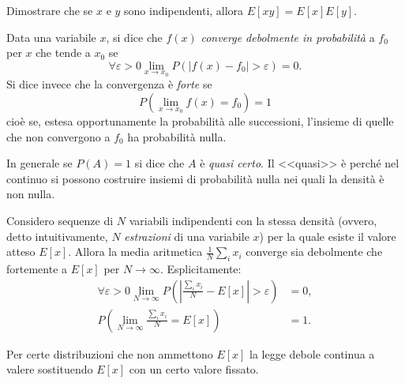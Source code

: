 \begin{exercise}
    Dimostrare che se $x$ e $y$ sono indipendenti, allora $E[xy] = E[x]E[y]$.
\end{exercise}

\begin{definition}
	Data una variabile $x$, si dice che $f(x)$ \emph{converge debolmente in probabilità} a $f_0$ per $x$ che tende a $x_0$ se
	\begin{equation*}
		\forall\varepsilon > 0 \lim_{x\to x_0} P\left( \left| f(x) - f_0 \right| > \varepsilon \right) = 0.
	\end{equation*}
	Si dice invece che la convergenza è \emph{forte} se
	\begin{equation*}
		P\left( \lim_{x\to x_0} f(x) = f_0 \right) = 1
	\end{equation*}
	cioè se, estesa opportunamente la probabilità alle successioni, l'insieme di quelle che non convergono a $f_0$ ha probabilità nulla.
\end{definition}

In generale se $P(A)=1$ si dice che $A$ è \emph{quasi certo}. Il <<quasi>> è perché nel continuo si possono costruire insiemi di probabilità nulla nei quali la densità è non nulla.

\begin{fact}
	\label{th:grossnum}
	Considero sequenze di $N$ variabili indipendenti con la stessa densità (ovvero, detto intuitivamente, $N$ \emph{estrazioni} di una variabile $x$) per la quale esiste il valore atteso $E[x]$.
	Allora la media aritmetica $\frac1N\sum_ix_i$ converge sia debolmente che fortemente a $E[x]$ per $N\to\infty$.
	Esplicitamente:
	\begin{align*}
		\forall\varepsilon > 0 \lim_{N\to \infty} P\left( \left| \frac{\sum_ix_i}N - E[x] \right| > \varepsilon \right) &= 0, \\
		P\left( \lim_{N\to \infty} \frac{\sum_ix_i}N = E[x] \right) &= 1.
	\end{align*}
\end{fact}

\noindent Per certe distribuzioni che non ammettono $E[x]$ la legge debole continua a valere sostituendo $E[x]$ con un certo valore fissato.

